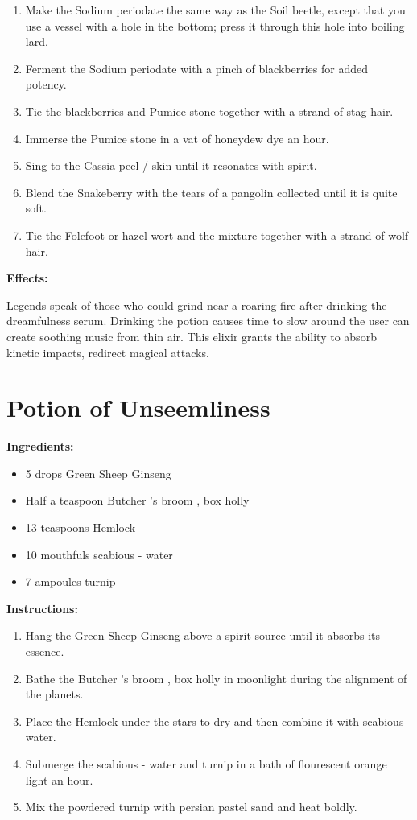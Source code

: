 \documentclass{article}
\begin{document}
\begin{enumerate}
  \item Make the Sodium periodate the same way as the Soil beetle, except that you use a vessel with a hole in the bottom; press it through this hole into boiling lard.
  \item Ferment the Sodium periodate with a pinch of blackberries for added potency.
  \item Tie the blackberries and Pumice stone together with a strand of stag hair.
  \item Immerse the Pumice stone in a vat of honeydew dye an hour.
  \item Sing to the Cassia peel / skin until it resonates with spirit.
  \item Blend the Snakeberry with the tears of a pangolin collected until it is quite soft.
  \item Tie the Folefoot or hazel wort and the mixture together with a strand of wolf hair.
\end{enumerate}

\textbf{Effects:}

Legends speak of those who could grind near a roaring fire after drinking the dreamfulness serum. Drinking the potion causes time to slow around the user can create soothing music from thin air. This elixir grants the ability to absorb kinetic impacts, redirect magical attacks.

\newpage
\section*{Potion of Unseemliness}

\textbf{Ingredients:}

\begin{itemize}
  \item 5 drops Green Sheep Ginseng
  \item Half a teaspoon Butcher 's broom , box holly
  \item 13 teaspoons Hemlock
  \item 10 mouthfuls scabious - water
  \item 7 ampoules turnip
\end{itemize}

\textbf{Instructions:}

\begin{enumerate}
  \item Hang the Green Sheep Ginseng above a spirit source until it absorbs its essence.
  \item Bathe the Butcher 's broom , box holly in moonlight during the alignment of the planets.
  \item Place the Hemlock under the stars to dry and then combine it with scabious - water.
  \item Submerge the scabious - water and turnip in a bath of flourescent orange light an hour.
  \item Mix the powdered turnip with persian pastel sand and heat boldly.
\end{enumerate}
\end{document}
